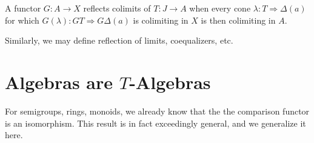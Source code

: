\begin{definition}[Reflection]\label{dfn:6.4}
	A functor $G : A \to X$ reflects colimits of $T : J \to A$ when every cone $\lambda : T \Rightarrow \Delta(a)$ for which $G(\lambda) : GT \Rightarrow G\Delta(a)$ is colimiting in $X$ is then colimiting in $A$.
\end{definition}

Similarly, we may define reflection of limits, coequalizers, etc.

\section{Algebras are $T$-Algebras}

For semigroups, rings, monoids, we already know that the the comparison functor is an isomorphism. This result is in fact exceedingly general, and we generalize it here.

